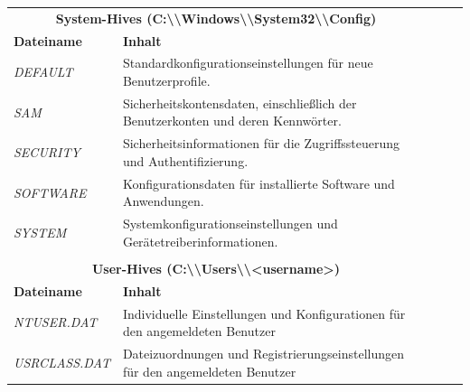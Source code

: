 \begin{table}[h!]
\begin{tabular}{lllll}
\cline{1-2}
\multicolumn{2}{|c|}{\textbf{System-Hives (C:\textbackslash{}\textbackslash{}Windows\textbackslash{}\textbackslash{}System32\textbackslash{}\textbackslash{}Config)}} &  &  &  \\ \cline{1-2}
\multicolumn{1}{|l|}{\textbf{Dateiname}}             & \multicolumn{1}{l|}{\textbf{Inhalt}}                                                                           &  &  &  \\ \cline{1-2}
\multicolumn{1}{|l|}{\textit{DEFAULT}}               & \multicolumn{1}{l|}{Standardkonfigurationseinstellungen für neue Benutzerprofile.}                             &  &  &  \\ \cline{1-2}
\multicolumn{1}{|l|}{\textit{SAM}}                   & \multicolumn{1}{l|}{Sicherheitskontensdaten, einschließlich der Benutzerkonten und deren Kennwörter.}          &  &  &  \\ \cline{1-2}
\multicolumn{1}{|l|}{\textit{SECURITY}}              & \multicolumn{1}{l|}{Sicherheitsinformationen für die Zugriffssteuerung und Authentifizierung.}                 &  &  &  \\ \cline{1-2}
\multicolumn{1}{|l|}{\textit{SOFTWARE}}              & \multicolumn{1}{l|}{Konfigurationsdaten für installierte Software und Anwendungen.}                            &  &  &  \\ \cline{1-2}
\multicolumn{1}{|l|}{\textit{SYSTEM}}                & \multicolumn{1}{l|}{Systemkonfigurationseinstellungen und Gerätetreiberinformationen.}                         &  &  &  \\ \cline{1-2}
                                                     &                                                                                                                &  &  &  \\ \cline{1-2}
\multicolumn{2}{|c|}{\textbf{User-Hives (C:\textbackslash{}\textbackslash{}Users\textbackslash{}\textbackslash{}\textless{}username\textgreater{})}}                  &  &  &  \\ \cline{1-2}
\multicolumn{1}{|l|}{\textbf{Dateiname}}             & \multicolumn{1}{l|}{\textbf{Inhalt}}                                                                           &  &  &  \\ \cline{1-2}
\multicolumn{1}{|l|}{\textit{NTUSER.DAT}}            & \multicolumn{1}{l|}{Individuelle Einstellungen und Konfigurationen für den angemeldeten Benutzer}              &  &  &  \\ \cline{1-2}
\multicolumn{1}{|l|}{\textit{USRCLASS.DAT}}          & \multicolumn{1}{l|}{Dateizuordnungen und Registrierungseinstellungen für den angemeldeten Benutzer}            &  &  &  \\ \cline{1-2}
\end{tabular}
\end{table}
	


